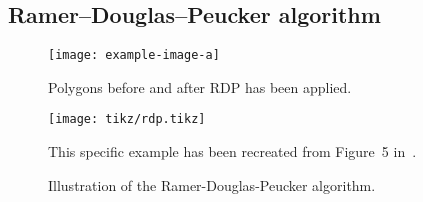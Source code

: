 \subsection{Ramer–Douglas–Peucker algorithm}

\begin{figure}[H]
  \centering
  \texttt{[image: example-image-a]}
  \caption{Polygons before and after RDP has been applied.}
\end{figure}

\begin{figure}
  \centering
  \texttt{[image: tikz/rdp.tikz]}
  \caption{%
    Illustration of the Ramer-Douglas-Peucker algorithm.
  }{%
    This specific example has been recreated from Figure~5 in~\cite{original-rdp-figure}.
  }
  \label{}
\end{figure}
